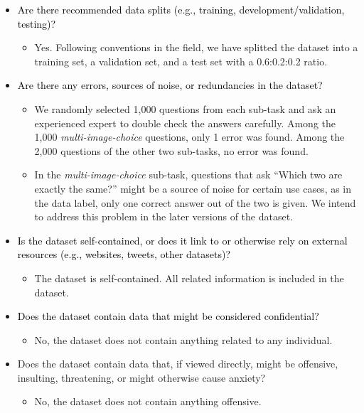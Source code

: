 \documentclass{article}
\newcommand{\ques}[1]{\textcolor{black}{#1}}
\begin{document}
\begin{itemize}
    \item \ques{Are there recommended data splits (e.g., training, development/validation, testing)?}
    \begin{itemize}
        \item Yes. Following conventions in the field, we have splitted the dataset into a training set, a validation set, and a test set with a 0.6:0.2:0.2 ratio.
    \end{itemize}
    \item \ques{Are there any errors, sources of noise, or redundancies in the
dataset?}
    \begin{itemize}
        \item We randomly selected 1,000 questions from each sub-task and ask an experienced expert to double check the answers carefully. Among the 1,000 \textit{multi-image-choice} questions, only 1 error was found. Among the 2,000 questions of the other two sub-tasks, no error was found.
        \item In the \textit{multi-image-choice} sub-task, questions that ask ``Which two are exactly the same?'' might be a source of noise for certain use cases, as in the data label, only one correct answer out of the two is given. We intend to address this problem in the later versions of the dataset.
    \end{itemize}
    \item \ques{Is the dataset self-contained, or does it link to or otherwise rely on
external resources (e.g., websites, tweets, other datasets)?}
    \begin{itemize}
        \item The dataset is self-contained. All related information is included in the dataset.
    \end{itemize}
    \item \ques{Does the dataset contain data that might be considered confidential?}
    \begin{itemize}
        \item No, the dataset does not contain anything related to any individual.
    \end{itemize}
    \item Does the dataset contain data that, if viewed directly, might be offensive, insulting, threatening, or might otherwise cause anxiety?
    \begin{itemize}
        \item No, the dataset does not contain anything offensive.
    \end{itemize}
\end{itemize}
\end{document}
